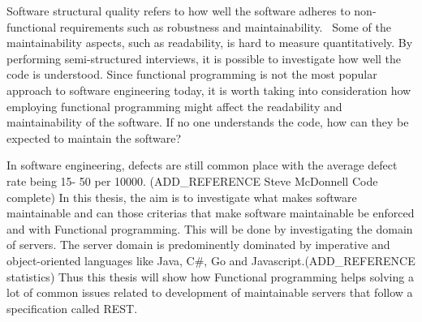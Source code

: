 Software structural quality refers to how well the software adheres to
non-functional requirements such as robustness and
maintainability.~\cite{Pressman:2004:SEP:994110} Some of the maintainability
aspects, such as readability, is hard to measure quantitatively. By performing
semi-structured interviews, it is possible to investigate how well the code is
understood. Since functional programming is not the most popular approach to
software engineering today, it is worth taking into consideration how employing
functional programming might affect the readability and maintainability of
the software. If no one understands the code, how can they be expected to
maintain the software?

In software engineering, defects are still common place with the average defect
rate being 15- 50 per 10000. (ADD\_REFERENCE Steve McDonnell Code complete)  In
this thesis, the aim is to investigate what makes software maintainable and can
those criterias that make software maintainable be enforced and with Functional
programming. This will be done by investigating the domain of servers. The
server domain is predominently dominated by imperative and object-oriented
languages like Java, C\#, Go and Javascript.(ADD\_REFERENCE statistics) Thus
this thesis will show how Functional programming helps solving a lot of common
issues related to development of maintainable servers that follow a
specification called REST.
